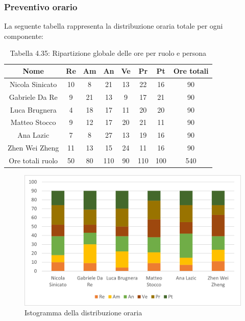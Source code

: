 \subsubsection{Preventivo orario}
La seguente tabella rappresenta la distribuzione oraria totale per ogni componente:
\begin{table}[h]
	\setlength\extrarowheight{5pt}
	\centering
	\begin{tabularx}{\textwidth}{|ccccccc|c|}
		\hline
		\rowcolor{white}
		\textbf{Nome} & \textbf{Re} & \textbf{Am} & \textbf{An} & \textbf{Ve} & \textbf{Pr}& \textbf{Pt} & \textbf{Ore totali} \\
		\hline
		Nicola Sinicato &10&8&21&13&22&16&90 \\
		Gabriele Da Re &9&21&13&9&17&21&90 \\
		Luca Brugnera &4&18&17&11&20&20&90 \\
		Matteo Stocco &9&12&17&20&21&11&90 \\
		Ana Lazic &7&8&27&13&19&16&90 \\
		Zhen Wei Zheng &11&13&15&24&11&16&90 \\
		\hline
		Ore totali ruolo &50&80&110&90&110&100&540 \\
		\hline
	\end{tabularx}
	\vspace{10pt}
	\caption{Tabella 4.35: Ripartizione globale delle ore per ruolo e persona}
\end{table}
\begin{figure}[H]
    \centering
    \includegraphics[scale=0.6]{img/grafi preventivo/istogrammi/totale/totale.png}
    \caption{Istogramma della distribuzione oraria}
\end{figure}
